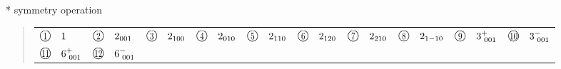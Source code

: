 \documentclass[fleqn,10pt,landscape]{jsarticle}
\begin{document}
* symmetry operation
\begin{quote}
\begin{tabular}{llllllllll}
$ {\ooalign{\hfil\resizebox{.8\width}{\height}{1}\hfil\crcr\raise.1ex\hbox{\large$\bigcirc$}}}\quad 1 $ & $ {\ooalign{\hfil\resizebox{.8\width}{\height}{2}\hfil\crcr\raise.1ex\hbox{\large$\bigcirc$}}}\quad 2{}_{001} $ & $ {\ooalign{\hfil\resizebox{.8\width}{\height}{3}\hfil\crcr\raise.1ex\hbox{\large$\bigcirc$}}}\quad 2{}_{100} $ & $ {\ooalign{\hfil\resizebox{.8\width}{\height}{4}\hfil\crcr\raise.1ex\hbox{\large$\bigcirc$}}}\quad 2{}_{010} $ & $ {\ooalign{\hfil\resizebox{.8\width}{\height}{5}\hfil\crcr\raise.1ex\hbox{\large$\bigcirc$}}}\quad 2{}_{110} $ & $ {\ooalign{\hfil\resizebox{.8\width}{\height}{6}\hfil\crcr\raise.1ex\hbox{\large$\bigcirc$}}}\quad 2{}_{120} $ & $ {\ooalign{\hfil\resizebox{.8\width}{\height}{7}\hfil\crcr\raise.1ex\hbox{\large$\bigcirc$}}}\quad 2{}_{210} $ & $ {\ooalign{\hfil\resizebox{.8\width}{\height}{8}\hfil\crcr\raise.1ex\hbox{\large$\bigcirc$}}}\quad 2{}_{1-10} $ & $ {\ooalign{\hfil\resizebox{.8\width}{\height}{9}\hfil\crcr\raise.1ex\hbox{\large$\bigcirc$}}}\quad 3^{+}_{\,\,001} $ & $ {\ooalign{\hfil\resizebox{.8\width}{\height}{10}\hfil\crcr\raise.1ex\hbox{\large$\bigcirc$}}}\quad 3^{-}_{\,\,001} $ \\
$ {\ooalign{\hfil\resizebox{.8\width}{\height}{11}\hfil\crcr\raise.1ex\hbox{\large$\bigcirc$}}}\quad 6^{+}_{\,\,001} $ & $ {\ooalign{\hfil\resizebox{.8\width}{\height}{12}\hfil\crcr\raise.1ex\hbox{\large$\bigcirc$}}}\quad 6^{-}_{\,\,001} $ & $  $ & $  $ & $  $ & $  $ & $  $ & $  $ & $  $ & $  $
\end{tabular}
\end{quote}
\end{document}
